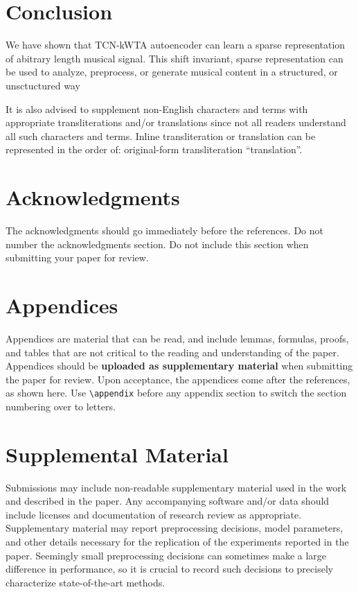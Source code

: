 \documentclass[11pt,a4paper]{article}
\begin{document}
\section{Conclusion}

We have shown that TCN-kWTA autoencoder can learn a sparse representation of abitrary length musical signal. This shift invariant, sparse representation can be used to analyze, preprocess, or generate musical content in a structured, or unsctuctured way

It is also advised to supplement non-English characters and terms
with appropriate transliterations and/or translations
since not all readers understand all such characters and terms.
Inline transliteration or translation can be represented in
the order of: original-form transliteration ``translation''.

\section*{Acknowledgments}

The acknowledgments should go immediately before the references.  Do
not number the acknowledgments section. Do not include this section
when submitting your paper for review. \\


\appendix

\section{Appendices}
\label{sec:appendix}
Appendices are material that can be read, and include lemmas, formulas, proofs, and tables that are not critical to the reading and understanding of the paper. 
Appendices should be \textbf{uploaded as supplementary material} when submitting the paper for review. Upon acceptance, the appendices come after the references, as shown here. Use
\verb|\appendix| before any appendix section to switch the section
numbering over to letters.


\section{Supplemental Material}
\label{sec:supplemental}
Submissions may include non-readable supplementary material used in the work and described in the paper. Any accompanying software and/or data should include licenses and documentation of research review as appropriate. Supplementary material may report preprocessing decisions, model parameters, and other details necessary for the replication of the experiments reported in the paper. Seemingly small preprocessing decisions can sometimes make a large difference in performance, so it is crucial to record such decisions to precisely characterize state-of-the-art methods. 
\end{document}
